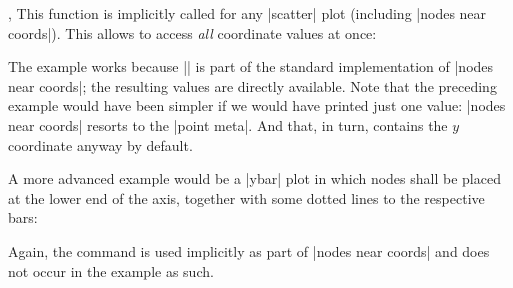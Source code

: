 \begin{commandlist}{\pgfplotspointgetcoordinates,\pgfplotspointgetcoordinates{}}
    This function is implicitly called for any |scatter| plot (including
    |nodes near coords|). This allows to access \emph{all} coordinate values at
    once:
\begin{codeexample}[]
\end{codeexample}
    The example works because |\pgfplotspointgetcoordinates| is part of the
    standard implementation of |nodes near coords|; the resulting values are
    directly available. Note that the preceding example would have been simpler
    if we would have printed just one value: |nodes near coords| resorts to the
    |point meta|. And that, in turn, contains the $y$ coordinate anyway by
    default.

    A more advanced example would be a |ybar| plot in which nodes shall be
    placed at the lower end of the axis, together with some dotted lines to the
    respective bars:
\begin{codeexample}[]
\end{codeexample}
    Again, the command is used implicitly as part of |nodes near coords| and
    does not occur in the example as such.


\end{commandlist}
